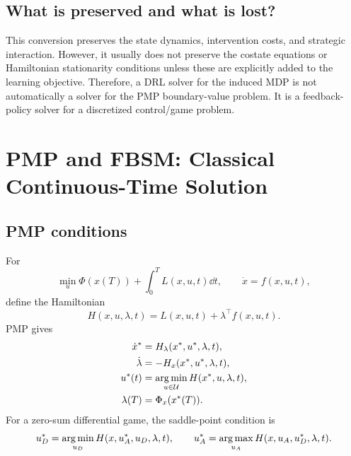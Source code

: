 \documentclass[11pt,a4paper]{article}
\begin{document}
\subsection{What is preserved and what is lost?}
This conversion preserves the state dynamics, intervention costs, and strategic interaction. However, it usually does not preserve the costate equations or Hamiltonian stationarity conditions unless these are explicitly added to the learning objective. Therefore, a DRL solver for the induced MDP is not automatically a solver for the PMP boundary-value problem. It is a feedback-policy solver for a discretized control/game problem.

\section{PMP and FBSM: Classical Continuous-Time Solution}
\subsection{PMP conditions}
For
\begin{equation}
\min_u \Phi(x(T))+\int_0^T L(x,u,t)\dd t,
\qquad \dot{x}=f(x,u,t),
\end{equation}
define the Hamiltonian
\begin{equation}
H(x,u,\lambda,t)=L(x,u,t)+\lambda^\top f(x,u,t).
\end{equation}
PMP gives \cite{pontryagin1962,lenhart2007}
\begin{align}
\dot{x}^*&=H_\lambda(x^*,u^*,\lambda,t),\\
\dot{\lambda}&=-H_x(x^*,u^*,\lambda,t),\\
u^*(t)&=\operatorname*{arg\,min}_{u\in\mathcal{U}}H(x^*,u,\lambda,t),\\
\lambda(T)&=\Phi_x(x^*(T)).
\end{align}
For a zero-sum differential game, the saddle-point condition is
\begin{equation}
u_D^*=\operatorname*{arg\,min}_{u_D}H(x,u_A^*,u_D,\lambda,t),\qquad
u_A^*=\operatorname*{arg\,max}_{u_A}H(x,u_A,u_D^*,\lambda,t).
\end{equation}
\end{document}
